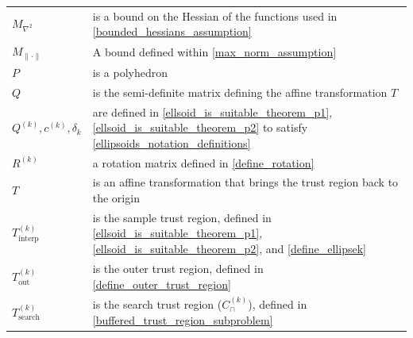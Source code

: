 \documentclass{article}
\theoremstyle{case}
\numberwithin{theorem}{subsection}
\newcommand{\capcones}{{C^{(k)}_{\cap}}}
\newcommand{\ck}{{c^{(k)}}}
\newcommand{\maxhessian}{{M_{\nabla^2}}}
\newcommand{\maxnorm}{{M_{\|\cdot\|}}}
\newcommand{\outertrk}{{T_{\text{out}}^{(k)}}}
\newcommand{\qk}{{Q^{(k)}}}
\newcommand{\rotk}{{R^{(k)}}}
\newcommand{\sampletrk}{{T_{\text{interp}}^{(k)}}}
\newcommand{\sdk}{{\delta_k}}
\newcommand{\searchtrk}{{T_{\text{search}}^{(k)}}}
\begin{document}
\begin{longtable}{| p{} | p{} |}
$\maxhessian$ & is a bound on the Hessian of the functions used in \cref{bounded_hessians_assumption} \\ %
$\maxnorm $ & A bound defined within \cref{max_norm_assumption} \\ %
$P$ & is a polyhedron \\ %
$Q$ & is the semi-definite matrix defining the affine transformation $T$ \\ %
$\qk, \ck, \sdk$ & are defined in \cref{ellsoid_is_suitable_theorem_p1}, \cref{ellsoid_is_suitable_theorem_p2} to satisfy \cref{ellipsoids_notation_definitions} \\ %
$\rotk$ & a rotation matrix defined in \cref{define_rotation} \\ %
$T$ & is an affine transformation that brings the trust region back to the origin \\ %
$\sampletrk $           & is the sample trust region, defined in \cref{ellsoid_is_suitable_theorem_p1}, \cref{ellsoid_is_suitable_theorem_p2}, and \cref{define_ellipsek} \\ %
$\outertrk $            & is the outer trust region, defined in \cref{define_outer_trust_region} \\ %
$\searchtrk $           & is the search trust region ($\capcones$), defined in \cref{buffered_trust_region_subproblem} \\ %

\end{longtable}
\end{document}
